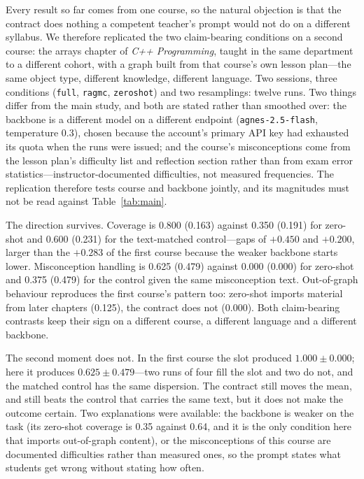 \documentclass[review,12pt]{elsarticle}
\renewcommand{\_}{\kgunderscore\allowbreak}
\newcommand{\id}[1]{\texttt{#1}}
\begin{document}
Every result so far comes from one course, so the natural objection is that the
contract does nothing a competent teacher's prompt would not do on a different
syllabus. We therefore replicated the two claim-bearing conditions on a second
course: the arrays chapter of \emph{C++ Programming}, taught in the same
department to a different cohort, with a graph built from that course's own
lesson plan---the same object type, different knowledge, different language.
Two sessions, three conditions (\id{full}, \id{rag\_mc}, \id{zero\_shot}) and
two resamplings: twelve runs. Two things differ from the main study, and both
are stated rather than smoothed over: the backbone is a different model on a
different endpoint (\id{agnes-2.5-flash}, temperature 0.3), chosen because the
account's primary API key had exhausted its quota when the runs were issued; and the course's
misconceptions come from the lesson plan's difficulty list and reflection
section rather than from exam error statistics---instructor-documented
difficulties, not measured frequencies. The replication therefore tests course
and backbone jointly, and its magnitudes must not be read against
Table~\ref{tab:main}.

\begin{table}[t]
\caption{Second course (\emph{C++ Programming}, arrays chapter), three conditions
$\times$ two sessions $\times$ two resamplings ($n=4$ per condition), a different
backbone and endpoint from Table~\ref{tab:main}. Mean (standard deviation).
Generated by \id{paper/tables.py -{}-course-b outputs/bench\_cpp}.}
\label{tab:course-b}
\centering
\small

\end{table}

The direction survives. Coverage is 0.800 (0.163) against 0.350 (0.191)
for zero-shot and 0.600 (0.231) for the text-matched control---gaps of $+0.450$
and $+0.200$, larger than the $+0.283$ of the first course because the weaker
backbone starts lower. Misconception handling is 0.625 (0.479) against 0.000
(0.000) for zero-shot and 0.375 (0.479) for the control given the same
misconception text. Out-of-graph behaviour reproduces the first course's
pattern too: zero-shot imports material from later chapters (0.125), the
contract does not (0.000). Both claim-bearing contrasts keep their sign on a
different course, a different language and a different backbone.

The second moment does not. In the first course the slot produced
$1.000 \pm 0.000$; here it produces $0.625 \pm 0.479$---two runs of four fill
the slot and two do not, and the matched control has the same dispersion. The
contract still moves the mean, and still beats the control that carries the
same text, but it does not make the outcome certain. Two explanations were
available: the backbone is weaker on the task (its zero-shot coverage is 0.35
against 0.64, and it is the only condition here that imports out-of-graph
content), or the misconceptions of this course are documented difficulties
rather than measured ones, so the prompt states what students get wrong without
stating how often.
\end{document}
